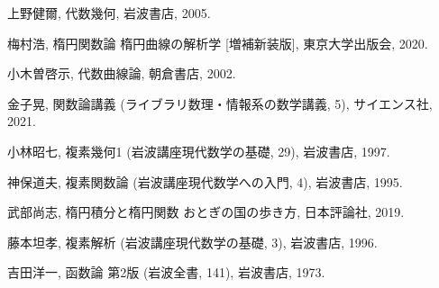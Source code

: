 \documentclass[11pt, a4paper, dvipdfmx, draft]{jsarticle}
\theoremstyle{definition}
\theoremstyle{mystyle}
\numberwithin{equation}{section} %
\begin{document}
\begin{thebibliography}{15}

     上野健爾, 代数幾何, 岩波書店, 2005.

     梅村浩, 楕円関数論 楕円曲線の解析学 [増補新装版], 東京大学出版会, 2020.

     小木曽啓示, 代数曲線論, 朝倉書店, 2002.

     金子晃, 関数論講義 (ライブラリ数理・情報系の数学講義, 5), サイエンス社, 2021.

     小林昭七, 複素幾何1 (岩波講座現代数学の基礎, 29), 岩波書店, 1997.

     神保道夫, 複素関数論 (岩波講座現代数学への入門, 4), 岩波書店, 1995.

     武部尚志, 楕円積分と楕円関数 おとぎの国の歩き方, 日本評論社, 2019.

     藤本坦孝, 複素解析 (岩波講座現代数学の基礎, 3), 岩波書店, 1996.

     吉田洋一, 函数論 第2版 (岩波全書, 141), 岩波書店, 1973.

\end{thebibliography}
\end{document}
